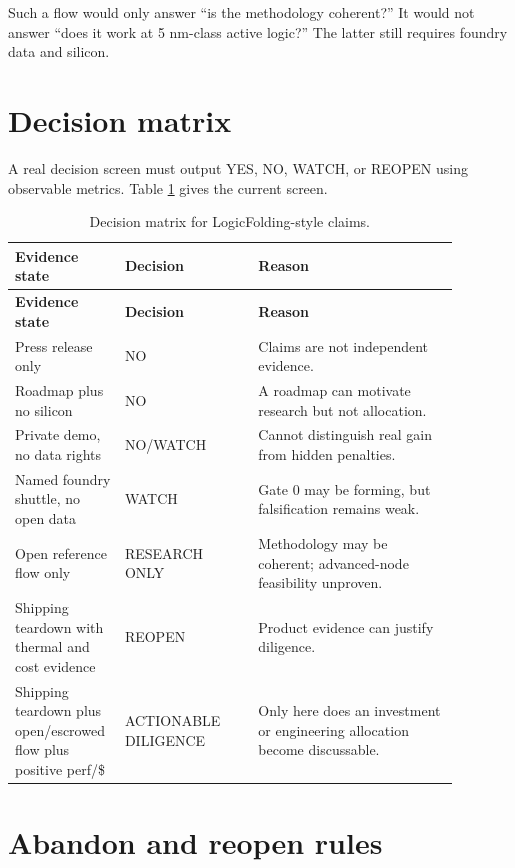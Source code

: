 \documentclass[11pt]{article}
\begin{document}
Such a flow would only answer ``is the methodology coherent?'' It would not answer ``does it work at 5 nm-class active logic?'' The latter still requires foundry data and silicon.

\section{Decision matrix}
A real decision screen must output YES, NO, WATCH, or REOPEN using observable metrics. Table \ref{tab:decision_matrix} gives the current screen.

\begin{longtable}{p{0.18\linewidth}p{0.28\linewidth}p{0.42\linewidth}}
\caption{Decision matrix for LogicFolding-style claims.}\label{tab:decision_matrix}\\
\toprule
\textbf{Evidence state} & \textbf{Decision} & \textbf{Reason}\\
\midrule
\endfirsthead
\toprule
\textbf{Evidence state} & \textbf{Decision} & \textbf{Reason}\\
\midrule
\endhead
Press release only & NO & Claims are not independent evidence.\\
Roadmap plus no silicon & NO & A roadmap can motivate research but not allocation.\\
Private demo, no data rights & NO/WATCH & Cannot distinguish real gain from hidden penalties.\\
Named foundry shuttle, no open data & WATCH & Gate 0 may be forming, but falsification remains weak.\\
Open reference flow only & RESEARCH ONLY & Methodology may be coherent; advanced-node feasibility unproven.\\
Shipping teardown with thermal and cost evidence & REOPEN & Product evidence can justify diligence.\\
Shipping teardown plus open/escrowed flow plus positive perf/\$ & ACTIONABLE DILIGENCE & Only here does an investment or engineering allocation become discussable.\\
\bottomrule
\end{longtable}

\section{Abandon and reopen rules}
\end{document}
